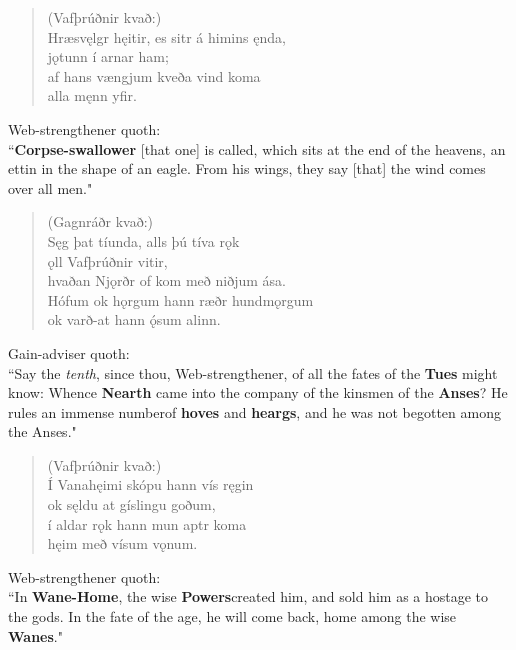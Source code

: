 \begin{verse}
(Vafþrúðnir kvað:) \\%
\bva Hræsvęlgr hęitir, \hld es sitr á himins ęnda, \\%
\ind jǫtunn í arnar ham; \\%
af hans vængjum \hld kveða vind koma \\%
\ind alla męnn yfir.\\%
\end{verse}

\bvb Web-strengthener quoth: \\ “\textbf{Corpse-swallower} [that one] is called, which sits at the end of the heavens, an ettin in the shape of an eagle. From his wings, they say [that] the wind comes over all men." \\

\begin{verse}
(Gagnráðr kvað:) \\%
\bva Sęg þat tíunda, \hld alls þú tíva rǫk \\%
\ind ǫll Vafþrúðnir vitir, \\%
hvaðan Njǫrðr of kom \hld með niðjum ása. \\%
Hófum ok hǫrgum \hld hann ræðr hundmǫrgum \\%
\ind ok varð-at hann ǫ́sum alinn.\\%
\end{verse}

\bvb Gain-adviser quoth: \\ “Say the \emph{tenth}, since thou, Web-strengthener, of all the fates of the \textbf{Tues} might know: Whence \textbf{Nearth} came into the company of the kinsmen of the \textbf{Anses}? He rules an immense number\footnotemark[68] of \textbf{hoves} and \textbf{heargs}, and he was not begotten among the Anses." \\

\begin{verse}
(Vafþrúðnir kvað:) \\%
\bva Í Vanahęimi \hld skópu hann vís ręgin \\%
\ind ok sęldu at gíslingu goðum, \\%
í aldar rǫk \hld hann mun aptr koma \\%
\ind hęim með vísum vǫnum.\\%
\end{verse}

\bvb Web-strengthener quoth: \\ “In \textbf{Wane-Home}, the wise \textbf{Powers}\footnotemark[69] created him, and sold him as a hostage to the gods. In the fate of the age, he will come back, home among the wise \textbf{Wanes}." \\


